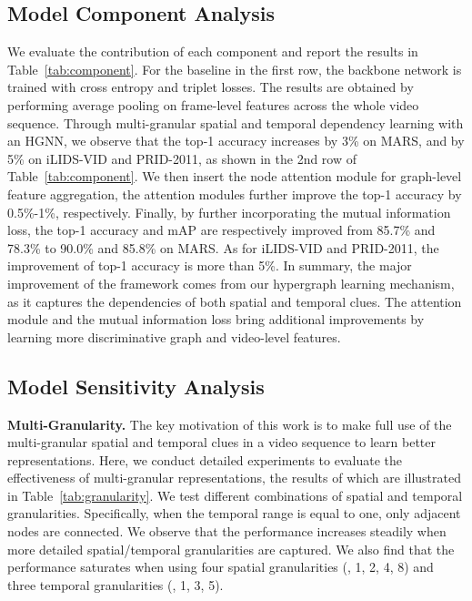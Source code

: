 \documentclass[10pt,twocolumn,letterpaper]{article}
\begin{document}
\subsection{Model Component Analysis}
We evaluate the contribution of each component and report the results in Table~\ref{tab:component}. For the baseline in the first row, the backbone network is trained with cross entropy and triplet losses. The results are obtained by performing average pooling on frame-level features across the whole video sequence. Through multi-granular spatial and temporal dependency learning with an HGNN, we observe that the top-1 accuracy increases by 3\% on MARS, and by 5\% on iLIDS-VID and PRID-2011, as shown in the 2nd row of Table~\ref{tab:component}. We then insert the node attention module for graph-level feature aggregation, the attention modules further improve the top-1 accuracy by 0.5\%-1\%, respectively. Finally, by further incorporating the mutual information loss, the top-1 accuracy and mAP are respectively improved from 85.7\% and 78.3\% to 90.0\% and 85.8\% on MARS. As for iLIDS-VID and PRID-2011, the improvement of top-1 accuracy is more than 5\%.
In summary, the major improvement of the framework comes from our hypergraph learning mechanism, as it captures the dependencies of both spatial and temporal clues. The attention module and the mutual information loss bring additional improvements by learning more discriminative graph and video-level features.



\subsection{Model Sensitivity Analysis}\label{sec:sensitivity}
\textbf{Multi-Granularity.} The key motivation of this work is to make full use of the multi-granular spatial and temporal clues in a video sequence to learn better representations. Here, we conduct detailed experiments to evaluate the effectiveness of multi-granular representations, the results of which are illustrated in Table~\ref{tab:granularity}. We test different combinations of spatial and temporal granularities. Specifically, when the temporal range is equal to one, only adjacent nodes are connected. We observe that the performance increases steadily when more detailed spatial/temporal granularities are captured. We also find that the performance saturates when using four spatial granularities (\ie, 1, 2, 4, 8) and three temporal granularities (\ie, 1, 3, 5).
\end{document}
